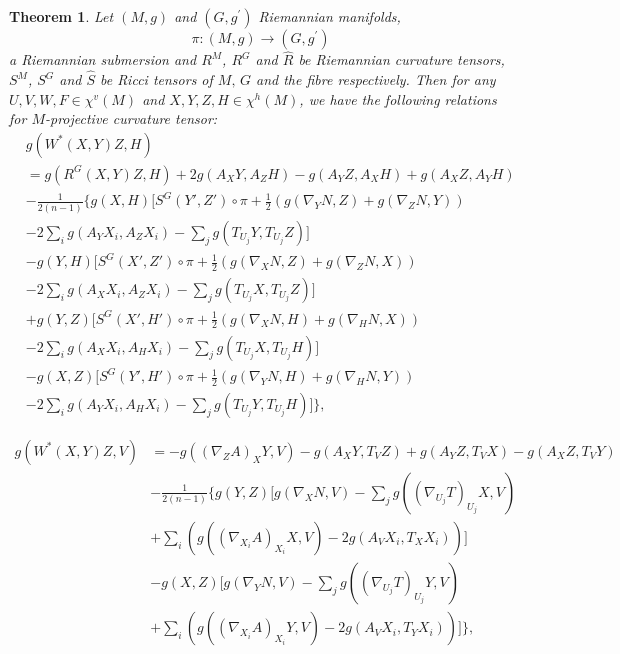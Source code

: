 \documentclass{birkjour}
\newtheorem{theorem}{Theorem}[section]
\theoremstyle{definition}
\theoremstyle{remark}
\numberwithin{equation}{section}
\begin{document}
\begin{theorem}
	Let $(M, g)$ and $(G, g^\prime)$ Riemannian manifolds,
	$$\pi: (M, g) \to(G, g^\prime)$$
	a Riemannian submersion and $R^M$, $R^G$ and  $\hat{R}$ be Riemannian curvature tensors, $S^M$, $S^G$ and  $\hat{S}$ be Ricci tensors of $M, \, G$ and the fibre respectively. Then for any $U, V, W, F \in \chi^v (M)$ and $X, Y, Z, H\in  \chi^h (M)$, we have the following relations for $M$-projective curvature tensor:
	\begin{align*}
		&g(W^* (X,Y)Z, H) \\
		&=g(R^G (X,Y)Z, H) +2 g (A_X Y, A_Z H) - g(A_Y Z, A_X H) + g(A_X Z, A_Y H) \\
		&- \frac{1}{2(n-1)} \Bigg\{g(X, H) \bigg[S^G (Y',Z') \circ \pi
		+\frac{1}{2} \left(g(\nabla_Y N,Z)+g(\nabla_Z N, Y)\right) \\
		&- 2 \sum_{i} g(A_Y X_i, A_Z X_i) - \sum_{j} g(T_{U_j}Y, T_{U_j}Z) \Bigg] \\
		&-g(Y,H) \bigg[S^G (X',Z') \circ \pi + \frac{1}{2} \left(g(\nabla_X N,Z)+ g(\nabla_Z N, X)\right) \\
		&-2 \sum_{i} g(A_X X_i, A_Z X_i)- \sum_{j}g(T_{U_j}X, T_{U_j}Z)  \bigg] \\
		&+g(Y,Z) \bigg[S^G (X',H') \circ \pi + \frac{1}{2} \left(g(\nabla_X N,H)+ g(\nabla_H N, X)\right)  \\
		&-2 \sum_{i} g(A_X X_i, A_H X_i)- \sum_{j}g(T_{U_j}X, T_{U_j}H)  \bigg] \\
		&-g(X,Z) \bigg[S^G (Y',H') \circ \pi + \frac{1}{2} \left(g(\nabla_Y N,H)+ g(\nabla_H N, Y)\right) \\
		&-2 \sum_{i} g(A_Y X_i, A_H X_i)- \sum_{j}g(T_{U_j}Y, T_{U_j}H)  \bigg]\Bigg\},
	\end{align*}
	
	\begin{align*}
		g(W^* (X,Y)Z, V) &=-g((\nabla_Z A)_X Y,V) - g(A_X Y, T_V Z) + g(A_Y Z, T_V X)- g(A_X Z, T_V Y) \\
		&- \frac{1}{2(n-1)} \Bigg\{g(Y, Z) \bigg[g(\nabla_X N,V)
		-\sum_{j} g((\nabla_{U_j} T)_{U_j} X, V) \\
		&+\sum_{i}\left(g((\nabla_{X_i}A)_{X_i} X,V )- 2 g (A_V X_i, T_X X_i) \right) \bigg] \\
		&  -g(X,Z) \bigg[g(\nabla_Y N,V)
		-\sum_{j} g((\nabla_{U_j} T)_{U_j} Y, V) \\
		&+ \sum_{i}\left(g((\nabla_{X_i}A)_{X_i} Y,V  ) - 2 g (A_V X_i, T_Y X_i) \right) \bigg] \Bigg\},
	\end{align*}
	

\end{theorem}
\end{document}
